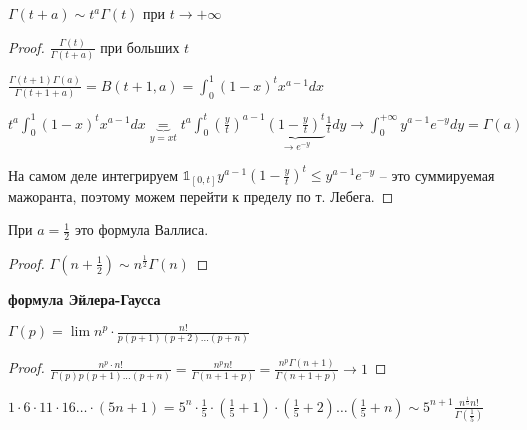 \begin{theorem}
    $\Gamma(t + a) \sim t^a \Gamma(t)$ при $t \to +\infty$
\end{theorem}

\begin{proof}
    $\frac{\Gamma(t)}{\Gamma(t + a)}$ при больших $t$

    $\frac{\Gamma(t + 1)\Gamma(a)}{\Gamma(t + 1 + a)} = B(t + 1, a) = \int_{0}^{1}(1 - x)^tx^{a - 1}dx$

    $t^a\int_{0}^{1}(1 - x)^tx^{a - 1}dx \underbrace{=}_{y = xt} t^a \int_{0}^{t} {\left(\frac{y}{t}\right)^{a - 1} \underbrace{\left(1 - \frac{y}{t}\right)^t}_{\to e^{-y}} \frac{1}{t} dy} \to \int_{0}^{+\infty}y^{a-1}e^{-y}dy = \Gamma(a)$

    На самом деле интегрируем $\mathds{1}_{[0, t]}y^{a-1}(1 - \frac{y}{t})^t \leq y^{a-1}e^{-y}$ -- это суммируемая мажоранта, поэтому можем перейти к пределу по т. Лебега.
\end{proof}

\begin{consequence}
    При $a = \frac{1}{2}$ это формула Валлиса.
\end{consequence}

\begin{proof}
    $\Gamma(n + \frac{1}{2}) \sim n^{\frac{1}{2}}\Gamma(n)$
\end{proof}

\begin{theorem}\textbf{формула Эйлера-Гаусса}
    
    $\Gamma(p) = \lim n^p \cdot \frac{n!}{p(p + 1)(p + 2)\dots (p + n)}$

\end{theorem}

\begin{proof}
    $\frac{n^p \cdot n!}{\Gamma(p)p(p + 1)...(p + n)} = \frac{n^p n!}{\Gamma(n + 1 + p)} = \frac{n^p\Gamma(n + 1)}{\Gamma(n + 1 + p)} \to 1$
\end{proof}

\begin{example}
    $1\cdot 6 \cdot 11 \cdot 16 \dots \cdot (5n + 1) = 5^n \cdot \frac{1}{5} \cdot (\frac{1}{5} + 1) \cdot (\frac{1}{5} + 2) \dots (\frac{1}{5} + n) \sim 5^{n+1}\frac{n^{\frac{1}{5}}n!}{\Gamma(\frac{1}{5})}$
\end{example}

